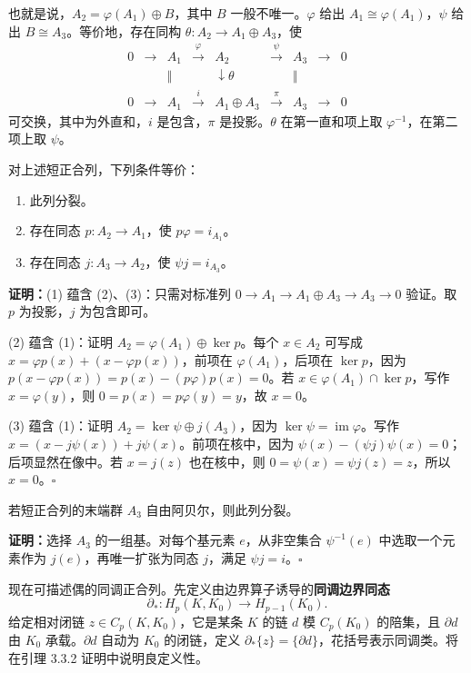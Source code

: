 也就是说，$A_2=\varphi(A_1)\oplus B$，其中 $B$ 一般不唯一。$\varphi$ 给出 $A_1\cong\varphi(A_1)$，$\psi$ 给出 $B\cong A_3$。等价地，存在同构 $\theta:A_2\to A_1\oplus A_3$，使
\[
\begin{array}{ccccccccc}
0&\to&A_1&\xrightarrow{\varphi}&A_2&\xrightarrow{\psi}&A_3&\to&0\\
&&\Vert&&\downarrow\scriptstyle\theta&&\Vert\\
0&\to&A_1&\xrightarrow{i}&A_1\oplus A_3&\xrightarrow{\pi}&A_3&\to&0
\end{array}
\]
可交换，其中为外直和，$i$ 是包含，$\pi$ 是投影。$\theta$ 在第一直和项上取 $\varphi^{-1}$，在第二项上取 $\psi$。

对上述短正合列，下列条件等价：
\begin{enumerate}[label=(\arabic*)]
\item 此列分裂。
\item 存在同态 $p:A_2\to A_1$，使 $p\varphi=i_{A_1}$。
\item 存在同态 $j:A_3\to A_2$，使 $\psi j=i_{A_3}$。
\end{enumerate}
\noindent\textbf{证明：}(1) 蕴含 (2)、(3)：只需对标准列 $0\to A_1\to A_1\oplus A_3\to A_3\to0$ 验证。取 $p$ 为投影，$j$ 为包含即可。

(2) 蕴含 (1)：证明 $A_2=\varphi(A_1)\oplus\ker p$。每个 $x\in A_2$ 可写成 $x=\varphi p(x)+(x-\varphi p(x))$，前项在 $\varphi(A_1)$，后项在 $\ker p$，因为 $p(x-\varphi p(x))=p(x)-(p\varphi)p(x)=0$。若 $x\in\varphi(A_1)\cap\ker p$，写作 $x=\varphi(y)$，则 $0=p(x)=p\varphi(y)=y$，故 $x=0$。

(3) 蕴含 (1)：证明 $A_2=\ker\psi\oplus j(A_3)$，因为 $\ker\psi=\operatorname{im}\varphi$。写作 $x=(x-j\psi(x))+j\psi(x)$。前项在核中，因为 $\psi(x)-(\psi j)\psi(x)=0$；后项显然在像中。若 $x=j(z)$ 也在核中，则 $0=\psi(x)=\psi j(z)=z$，所以 $x=0$。\hfill$\square$

若短正合列的末端群 $A_3$ 自由阿贝尔，则此列分裂。

\noindent\textbf{证明：}选择 $A_3$ 的一组基。对每个基元素 $e$，从非空集合 $\psi^{-1}(e)$ 中选取一个元素作为 $j(e)$，再唯一扩张为同态 $j$，满足 $\psi j=i$。\hfill$\square$

现在可描述偶的同调正合列。先定义由边界算子诱导的\textbf{同调边界同态}
\[
\partial_*:H_p(K,K_0)\to H_{p-1}(K_0).
\]
给定相对闭链 $z\in C_p(K,K_0)$，它是某条 $K$ 的链 $d$ 模 $C_p(K_0)$ 的陪集，且 $\partial d$ 由 $K_0$ 承载。$\partial d$ 自动为 $K_0$ 的闭链，定义 $\partial_*\{z\}=\{\partial d\}$，花括号表示同调类。将在引理 3.3.2 证明中说明良定义性。

